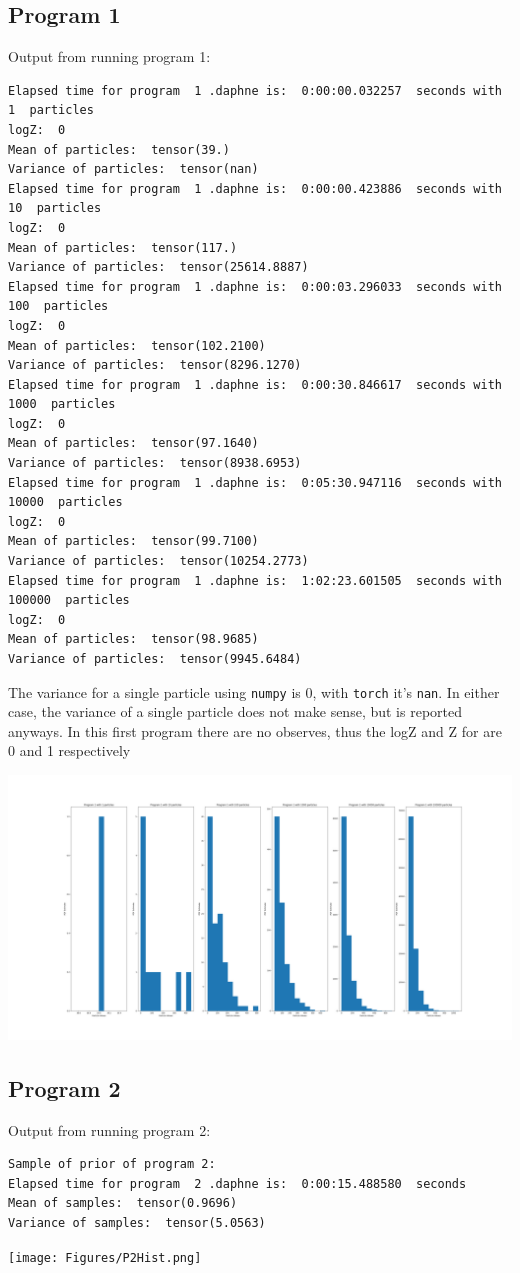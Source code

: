 \documentclass[]{article}
\begin{document}
\subsection{Program 1}
Output from running program 1:
\begin{verbatim}
Elapsed time for program  1 .daphne is:  0:00:00.032257  seconds with  1  particles
logZ:  0
Mean of particles:  tensor(39.)
Variance of particles:  tensor(nan)
Elapsed time for program  1 .daphne is:  0:00:00.423886  seconds with  10  particles
logZ:  0
Mean of particles:  tensor(117.)
Variance of particles:  tensor(25614.8887)
Elapsed time for program  1 .daphne is:  0:00:03.296033  seconds with  100  particles
logZ:  0
Mean of particles:  tensor(102.2100)
Variance of particles:  tensor(8296.1270)
Elapsed time for program  1 .daphne is:  0:00:30.846617  seconds with  1000  particles
logZ:  0
Mean of particles:  tensor(97.1640)
Variance of particles:  tensor(8938.6953)
Elapsed time for program  1 .daphne is:  0:05:30.947116  seconds with  10000  particles
logZ:  0
Mean of particles:  tensor(99.7100)
Variance of particles:  tensor(10254.2773)
Elapsed time for program  1 .daphne is:  1:02:23.601505  seconds with  100000  particles
logZ:  0
Mean of particles:  tensor(98.9685)
Variance of particles:  tensor(9945.6484)
\end{verbatim}
The variance for a single particle using \texttt{numpy} is 0, with \texttt{torch} it's \texttt{nan}. In either case, the variance of a single particle does not make sense, but is reported anyways. In this first program there are no observes, thus the logZ and Z for are 0 and 1 respectively
\begin{center}
	\includegraphics[width=\linewidth]{Figures/P1Hist.png}
\end{center}

\subsection{Program 2}
Output from running program 2:
\begin{verbatim}
Sample of prior of program 2:
Elapsed time for program  2 .daphne is:  0:00:15.488580  seconds
Mean of samples:  tensor(0.9696)
Variance of samples:  tensor(5.0563)
\end{verbatim}
\begin{center}
	\texttt{[image: Figures/P2Hist.png]}
\end{center}
\end{document}
